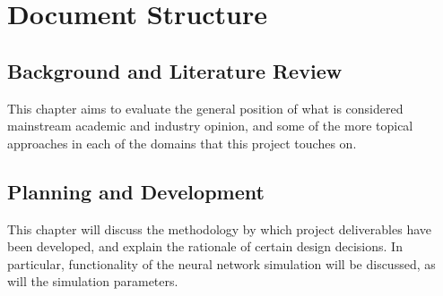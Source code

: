 \pagebreak




%

\section{Document Structure}

\subsection*{Background and Literature Review}
This chapter aims to evaluate the general position of what is considered
mainstream academic and industry opinion, and some of the more topical
approaches in each of the domains that this project touches on.

\subsection*{Planning and Development}
This chapter will discuss the methodology by which project deliverables have
been developed, and explain the rationale of certain design decisions. In
particular, functionality of the neural network simulation will be discussed, as
will the simulation parameters.

